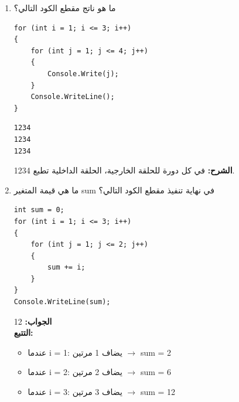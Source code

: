 \documentclass[14pt]{extarticle}
\begin{document}
\begin{enumerate}[itemsep=2em]
    \clearpage
    \item
    ما هو ناتج مقطع الكود التالي؟
    \begin{boxCode}
    \begin{english}
    \begin{verbatim}
for (int i = 1; i <= 3; i++)
{
    for (int j = 1; j <= 4; j++)
    {
        Console.Write(j);
    }
    Console.WriteLine();
}
    \end{verbatim}
    \end{english}
    \end{boxCode}
    \ifwithsols
    \begin{boxSolution}
    \begin{english}
    \begin{boxCode}
\begin{verbatim}
1234
1234
1234
    \end{verbatim}
\end{boxCode}
    \end{english}
    \textbf{الشرح:} في كل دورة للحلقة الخارجية، الحلقة الداخلية تطبع 1234.
    \end{boxSolution}
    \clearpage
    \fi

    \item
    ما هي قيمة المتغير \textenglish{sum} في نهاية تنفيذ مقطع الكود التالي؟
    \begin{boxCode}
    \begin{english}
    \begin{verbatim}
int sum = 0;
for (int i = 1; i <= 3; i++)
{
    for (int j = 1; j <= 2; j++)
    {
        sum += i;
    }
}
Console.WriteLine(sum);
    \end{verbatim}
    \end{english}
    \end{boxCode}
    \ifwithsols
    \begin{boxSolution}
    \textbf{الجواب:} 12\\
    \textbf{التتبع:}
    \begin{itemize}
        \item عندما \textenglish{i = 1}: يضاف 1 مرتين $\rightarrow$ \textenglish{sum = 2}
        \item عندما \textenglish{i = 2}: يضاف 2 مرتين $\rightarrow$ \textenglish{sum = 6}
        \item عندما \textenglish{i = 3}: يضاف 3 مرتين $\rightarrow$ \textenglish{sum = 12}
    \end{itemize}
    \end{boxSolution}
    \fi
\end{enumerate}
\end{document}

